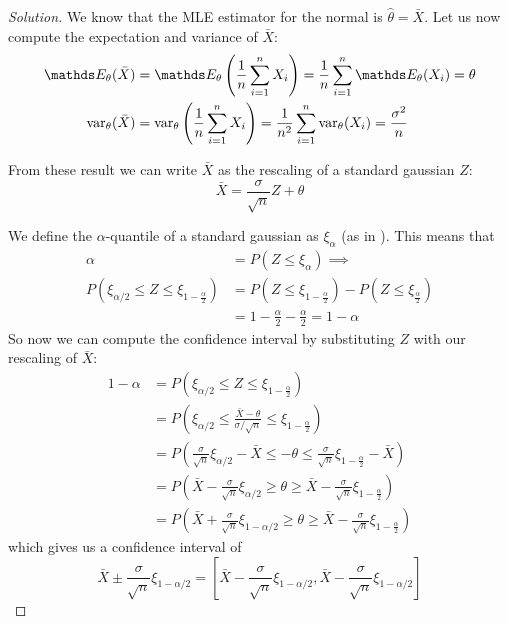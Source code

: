 \documentclass[12pt]{extarticle}
\begin{document}
\begin{proof}[Solution]
	We know that the MLE estimator for the normal is $\hat \theta = \bar X$.
	Let us now compute the expectation and variance of $\bar X$:
	\begin{align}
		\E_{\theta} (\bar X)   & = \E_\theta \left( \oneover{n} \sum_{i = 1}^n X_i \right) = \oneover n \sum_{i = 1}^n \E_\theta(X_i) = \theta                    \\
		\var_{\theta} (\bar X) & = \var_\theta \left( \oneover{n} \sum_{i = 1}^n X_i \right) = \oneover{n^2} \sum_{i = 1}^n \var_\theta(X_i) = \frac{\sigma^2}{n}
	\end{align}

	From these result we can write $\bar X$ as the rescaling of a standard gaussian $Z$:
	\begin{equation}
		\bar X = \frac{\sigma}{\sqrt{n}} Z + \theta
	\end{equation}

	We define the $\alpha$-quantile of a standard gaussian as $\xi_\alpha$ (as in ).
	This means that
	\begin{align}
		\alpha                                                 & = P(Z \leq \xi_\alpha) \implies                                        \\
		P(\xi_{\alpha/2} \leq Z \leq \xi_{1-\frac{\alpha}{2}}) & = P(Z \leq \xi_{1-\frac{\alpha}{2}}) -P(Z \leq \xi_{\frac{\alpha}{2}}) \\
		                                                       & = 1-\frac{\alpha}{2} -\frac{\alpha}{2} = 1- \alpha
	\end{align}
	So now we can compute the confidence interval by substituting $Z$ with our rescaling of $\bar X$:
	\begin{align}
		1 - \alpha & = P(\xi_{\alpha/2} \leq Z \leq \xi_{1-\frac{\alpha}{2}})                                                                                 \\
		           & = P\left(\xi_{\alpha/2} \leq \frac{\bar X - \theta}{\sigma / \sqrt n} \leq \xi_{1-\frac{\alpha}{2}}\right)                               \\
		           & = P\left(\frac{\sigma}{\sqrt n}\xi_{\alpha/2} - \bar X \leq - \theta \leq \frac{\sigma}{\sqrt n}\xi_{1-\frac{\alpha}{2}} - \bar X\right) \\
		           & = P\left(\bar X - \frac{\sigma}{\sqrt n}\xi_{\alpha/2} \geq \theta \geq \bar X -\frac{\sigma}{\sqrt n}\xi_{1-\frac{\alpha}{2}}\right)    \\
		           & = P\left(\bar X + \frac{\sigma}{\sqrt n}\xi_{1-\alpha/2} \geq \theta \geq \bar X -\frac{\sigma}{\sqrt n}\xi_{1-\frac{\alpha}{2}}\right)
	\end{align}
	which gives us a confidence interval of
	\begin{equation}
		\bar X \pm \frac{\sigma}{\sqrt n}\xi_{1-\alpha/2} = [\bar X - \frac{\sigma}{\sqrt n}\xi_{1-\alpha/2}, \bar X - \frac{\sigma}{\sqrt n}\xi_{1-\alpha/2}]
	\end{equation}
\end{proof}
\end{document}

